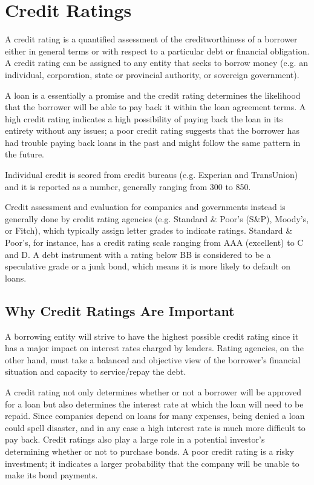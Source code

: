 {\section{Credit Ratings}\label{credit-ratings}

A credit rating is a quantified assessment of the creditworthiness of a
borrower either in general terms or with respect to a particular debt or
financial obligation. A credit rating can be assigned to any entity that
seeks to borrow money (e.g. an individual, corporation, state or
provincial authority, or sovereign government).

A loan is a essentially a promise and the credit rating determines the
likelihood that the borrower will be able to pay back it within the loan
agreement terms. A high credit rating indicates a high possibility of
paying back the loan in its entirety without any issues; a poor credit
rating suggests that the borrower has had trouble paying back loans in
the past and might follow the same pattern in the future.

Individual credit is scored from credit bureaus (e.g. Experian and
TransUnion) and it is reported as a number, generally ranging from 300
to 850.

Credit assessment and evaluation for companies and governments instead
is generally done by credit rating agencies (e.g. Standard \& Poor's
(S\&P), Moody's, or Fitch), which typically assign letter grades to
indicate ratings. Standard \& Poor's, for instance, has a credit rating
scale ranging from AAA (excellent) to C and D. A debt instrument with a
rating below BB is considered to be a speculative grade or a junk bond,
which means it is more likely to default on loans.

\subsection{Why Credit Ratings Are Important}\label{why-credit-ratings-are-important}

A borrowing entity will strive to have the highest possible credit
rating since it has a major impact on interest rates charged by lenders.
Rating agencies, on the other hand, must take a balanced and objective
view of the borrower's financial situation and capacity to service/repay
the debt.

A credit rating not only determines whether or not a borrower will be
approved for a loan but also determines the interest rate at which the
loan will need to be repaid. Since companies depend on loans for many
expenses, being denied a loan could spell disaster, and
in any case a high interest rate is much more difficult to pay back.
Credit ratings also play a large role in a potential investor's
determining whether or not to purchase bonds. A poor credit rating is a
risky investment; it indicates a larger probability that the company
will be unable to make its bond payments.

}
